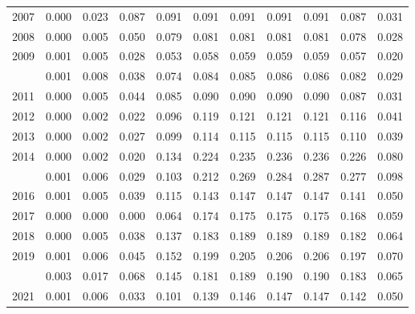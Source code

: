 \documentclass[
]{article}
\begin{document}
\begin{longtable}[t]{lrrrrrrrrrr}
2007 & 0.000 & 0.023 & 0.087 & 0.091 & 0.091 & 0.091 & 0.091 & 0.091 & 0.087 & 0.031\\
2008 & 0.000 & 0.005 & 0.050 & 0.079 & 0.081 & 0.081 & 0.081 & 0.081 & 0.078 & 0.028\\
2009 & 0.001 & 0.005 & 0.028 & 0.053 & 0.058 & 0.059 & 0.059 & 0.059 & 0.057 & 0.020\\
\addlinespace
2010 & 0.001 & 0.008 & 0.038 & 0.074 & 0.084 & 0.085 & 0.086 & 0.086 & 0.082 & 0.029\\
2011 & 0.000 & 0.005 & 0.044 & 0.085 & 0.090 & 0.090 & 0.090 & 0.090 & 0.087 & 0.031\\
2012 & 0.000 & 0.002 & 0.022 & 0.096 & 0.119 & 0.121 & 0.121 & 0.121 & 0.116 & 0.041\\
2013 & 0.000 & 0.002 & 0.027 & 0.099 & 0.114 & 0.115 & 0.115 & 0.115 & 0.110 & 0.039\\
2014 & 0.000 & 0.002 & 0.020 & 0.134 & 0.224 & 0.235 & 0.236 & 0.236 & 0.226 & 0.080\\
\addlinespace
2015 & 0.001 & 0.006 & 0.029 & 0.103 & 0.212 & 0.269 & 0.284 & 0.287 & 0.277 & 0.098\\
2016 & 0.001 & 0.005 & 0.039 & 0.115 & 0.143 & 0.147 & 0.147 & 0.147 & 0.141 & 0.050\\
2017 & 0.000 & 0.000 & 0.000 & 0.064 & 0.174 & 0.175 & 0.175 & 0.175 & 0.168 & 0.059\\
2018 & 0.000 & 0.005 & 0.038 & 0.137 & 0.183 & 0.189 & 0.189 & 0.189 & 0.182 & 0.064\\
2019 & 0.001 & 0.006 & 0.045 & 0.152 & 0.199 & 0.205 & 0.206 & 0.206 & 0.197 & 0.070\\
\addlinespace
2020 & 0.003 & 0.017 & 0.068 & 0.145 & 0.181 & 0.189 & 0.190 & 0.190 & 0.183 & 0.065\\
2021 & 0.001 & 0.006 & 0.033 & 0.101 & 0.139 & 0.146 & 0.147 & 0.147 & 0.142 & 0.050\\*
\end{longtable}
\end{document}
